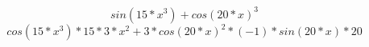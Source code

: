 \documentclass{article}
\begin{document}
$$sin{(15*x^{3})}+cos{(20*x)}^{3}$$
$$cos{(15*x^{3})}*15*3*x^{2}+3*cos{(20*x)}^{2}*(-1)*sin{(20*x)}*20$$
\end{document}
